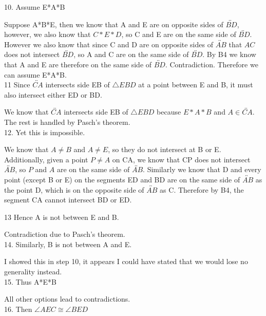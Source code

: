 \documentclass[12pt,letterpaper]{article}
\begin{document}
 


10. Assume E*A*B

Suppose A*B*E, then we know that A and E are on opposite sides of $\overleftrightarrow{BD}$, however, we also know that $C*E*D$, so C and E are on the same side of $\overleftrightarrow{BD}$.  However we also know that since C and D are on opposite sides of $\overleftrightarrow{AB}$ that $AC$ does not intersect $\overleftrightarrow{BD}$, so A and C are on the same side of $\overleftrightarrow{BD}$. By B4 we know that A and E are therefore on the same side of $\overleftrightarrow{BD}$.  Contradiction. Therefore we can assume E*A*B.\\





11 Since $\overleftrightarrow{CA}$ intersects side EB of $\triangle EBD$ at a point between E and B, it must also intersect either ED or BD.  

We know that $\overleftrightarrow{CA}$ intersects side EB of $\triangle EBD$ because $E*A*B$ and $A\in \overleftrightarrow{CA}$.  The rest is handled by Pasch's theorem.\\


12.  Yet this is impossible.

We know that $A\neq B$ and $A\neq E$, so they do not intersect at B or E.  Additionally, given a point $P\neq A$ on CA, we know that CP does not intersect $\overleftrightarrow{AB}$, so $P$ and $A$ are on the same side of $\overleftrightarrow{AB}$.  Similarly we know that D and every point (except B or E) on the segments ED and BD are on the same side of $\overleftrightarrow{AB}$ as the point D, which is on the opposite side of $\overleftrightarrow{AB}$ as C.  Therefore by B4, the segment CA cannot intersect BD or ED.



13 Hence A is not between E and B. 

Contradiction due to Pasch's theorem.\\


14.  Similarly, B is not between A and E.

I showed this in step 10, it appears I could have stated that we would lose no generality instead.\\


15.  Thus A*E*B

All other options lead to contradictions.\\

16.  Then $\angle AEC \cong \angle BED$
\end{document}
